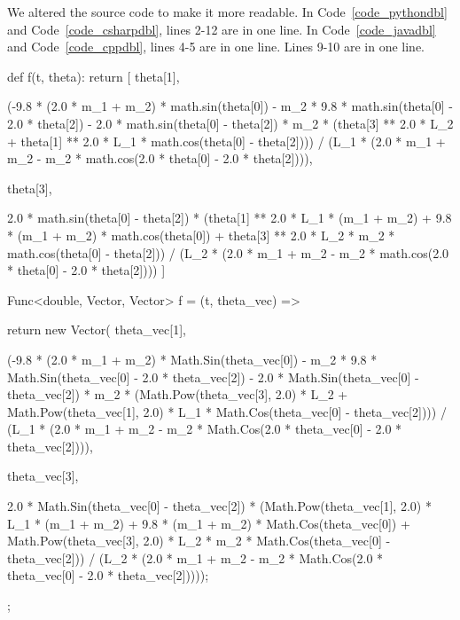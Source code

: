 We altered the source code to make it more readable. In Code~\ref{code_pythondbl} and Code~\ref{code_csharpdbl}, lines 2-12 are in one line. In Code~\ref{code_javadbl} and Code~\ref{code_cppdbl}, lines 4-5 are in one line. Lines 9-10 are in one line.
\begin{listing}[ht]
\begin{python1}
def f(t, theta):
	return [
		theta[1],

		(-9.8 * (2.0 * m_1 + m_2) * math.sin(theta[0]) - m_2 * 9.8 * math.sin(theta[0] - 2.0 * theta[2]) - 2.0 * math.sin(theta[0] - theta[2]) * m_2 * (theta[3] ** 2.0 * L_2 + theta[1] ** 2.0 * L_1 * math.cos(theta[0] - theta[2]))) 
			/ (L_1 * (2.0 * m_1 + m_2 - m_2 * math.cos(2.0 * theta[0] - 2.0 * theta[2]))), 
		
		theta[3], 
		
		2.0 * math.sin(theta[0] - theta[2]) * (theta[1] ** 2.0 * L_1 * (m_1 + m_2) + 9.8 * (m_1 + m_2) * math.cos(theta[0]) + theta[3] ** 2.0 * L_2 * m_2 * math.cos(theta[0] - theta[2])) 
			/ (L_2 * (2.0 * m_1 + m_2 - m_2 * math.cos(2.0 * theta[0] - 2.0 * theta[2])))
		]
\end{python1}
\label{code_pythondbl}
\end{listing} 

\begin{listing}[ht]
\begin{csharp1}
Func<double, Vector, Vector> f = (t, theta_vec) => {
	return new Vector(
		theta_vec[1], 

		(-9.8 * (2.0 * m_1 + m_2) * Math.Sin(theta_vec[0]) - m_2 * 9.8 * Math.Sin(theta_vec[0] - 2.0 * theta_vec[2]) - 2.0 * Math.Sin(theta_vec[0] - theta_vec[2]) * m_2 * (Math.Pow(theta_vec[3], 2.0) * L_2 + Math.Pow(theta_vec[1], 2.0) * L_1 * Math.Cos(theta_vec[0] - theta_vec[2]))) 
			/ (L_1 * (2.0 * m_1 + m_2 - m_2 * Math.Cos(2.0 * theta_vec[0] - 2.0 * theta_vec[2]))), 
		
		theta_vec[3], 

		2.0 * Math.Sin(theta_vec[0] - theta_vec[2]) * (Math.Pow(theta_vec[1], 2.0) * L_1 * (m_1 + m_2) + 9.8 * (m_1 + m_2) * Math.Cos(theta_vec[0]) + Math.Pow(theta_vec[3], 2.0) * L_2 * m_2 * Math.Cos(theta_vec[0] - theta_vec[2])) 
			/ (L_2 * (2.0 * m_1 + m_2 - m_2 * Math.Cos(2.0 * theta_vec[0] - 2.0 * theta_vec[2]))));
};
\end{csharp1}
\label{code_csharpdbl}
\end{listing} 

